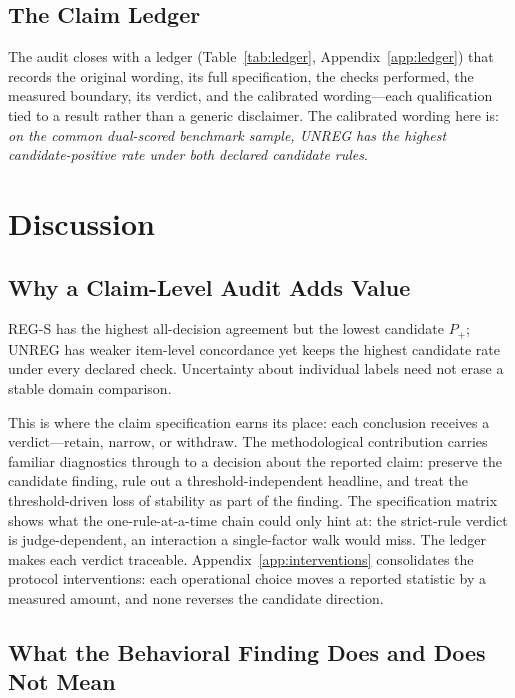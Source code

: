 \documentclass[11pt]{article}
\begin{document}
\subsection{The Claim Ledger}
\label{subsec:ledger}

The audit closes with a ledger (Table~\ref{tab:ledger}, Appendix~\ref{app:ledger}) that records the original wording, its full specification, the checks performed, the measured boundary, its verdict, and the calibrated wording---each qualification tied to a result rather than a generic disclaimer. The calibrated wording here is: \emph{on the common dual-scored benchmark sample, UNREG has the highest candidate-positive rate under both declared candidate rules}.

\section{Discussion}
\label{sec:discussion}

\subsection{Why a Claim-Level Audit Adds Value}

REG-S has the highest all-decision agreement but the lowest candidate $P_+$; UNREG has weaker item-level concordance yet keeps the highest candidate rate under every declared check. Uncertainty about individual labels need not erase a stable domain comparison.

This is where the claim specification earns its place: each conclusion receives a verdict---retain, narrow, or withdraw. The methodological contribution carries familiar diagnostics through to a decision about the reported claim: preserve the candidate finding, rule out a threshold-independent headline, and treat the threshold-driven loss of stability as part of the finding. The specification matrix shows what the one-rule-at-a-time chain could only hint at: the strict-rule verdict is judge-dependent, an interaction a single-factor walk would miss. The ledger makes each verdict traceable. Appendix~\ref{app:interventions} consolidates the protocol interventions: each operational choice moves a reported statistic by a measured amount, and none reverses the candidate direction.

\subsection{What the Behavioral Finding Does and Does Not Mean}
\end{document}
